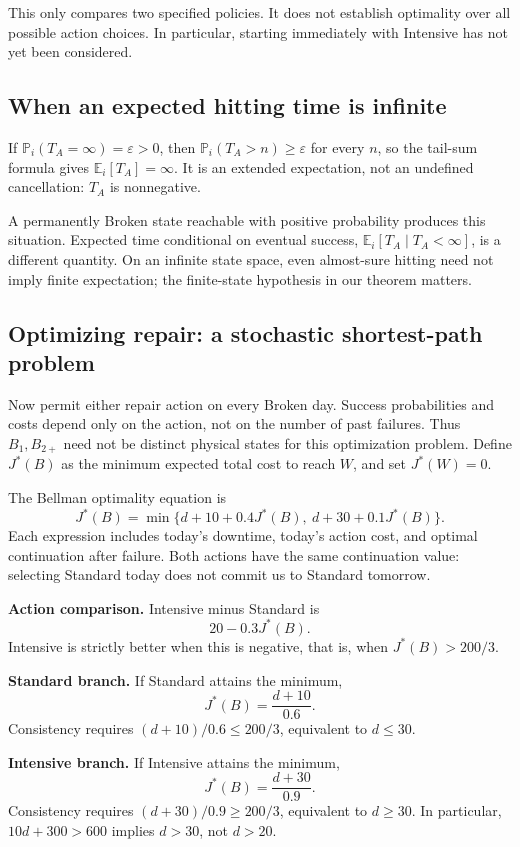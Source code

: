 \documentclass[11pt]{article}
\theoremstyle{remark}\newtheorem{remark}[definition]{Remark}
\newcommand{\E}{\mathbb E}\newcommand{\Prob}{\mathbb P}
\begin{document}
This only compares two specified policies. It does not establish optimality over all possible action choices. In particular, starting immediately with Intensive has not yet been considered.

\subsection{When an expected hitting time is infinite}
If $\Prob_i(T_A=\infty)=\varepsilon>0$, then $\Prob_i(T_A>n)\geq\varepsilon$ for every $n$, so the tail-sum formula gives $\E_i[T_A]=\infty$. It is an extended expectation, not an undefined cancellation: $T_A$ is nonnegative.

A permanently Broken state reachable with positive probability produces this situation. Expected time conditional on eventual success, $\E_i[T_A\mid T_A<\infty]$, is a different quantity. On an infinite state space, even almost-sure hitting need not imply finite expectation; the finite-state hypothesis in our theorem matters.

\clearpage
\subsection{Optimizing repair: a stochastic shortest-path problem}
Now permit either repair action on every Broken day. Success probabilities and costs depend only on the action, not on the number of past failures. Thus $B_1,B_{2+}$ need not be distinct physical states for this optimization problem. Define $J^*(B)$ as the minimum expected total cost to reach $W$, and set $J^*(W)=0$.

The Bellman optimality equation is
\[
\boxed{J^*(B)=\min\{d+10+0.4J^*(B),\ d+30+0.1J^*(B)\}.}
\]
Each expression includes today's downtime, today's action cost, and optimal continuation after failure. Both actions have the same continuation value: selecting Standard today does not commit us to Standard tomorrow.

\textbf{Action comparison.} Intensive minus Standard is
\[
20-0.3J^*(B).
\]
Intensive is strictly better when this is negative, that is, when $J^*(B)>200/3$.

\textbf{Standard branch.} If Standard attains the minimum,
\[
J^*(B)=\frac{d+10}{0.6}.
\]
Consistency requires $(d+10)/0.6\leq200/3$, equivalent to $d\leq30$.

\textbf{Intensive branch.} If Intensive attains the minimum,
\[
J^*(B)=\frac{d+30}{0.9}.
\]
Consistency requires $(d+30)/0.9\geq200/3$, equivalent to $d\geq30$. In particular, $10d+300>600$ implies $d>30$, not $d>20$.
\end{document}
